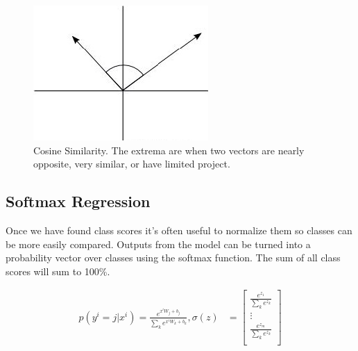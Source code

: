 \documentclass[twoside]{article}
\begin{document}
\begin{figure}[H]
\begin{minipage}[b]{0.25\textwidth}
    \caption*{$cos(\theta) \approx 1$}
  \end{minipage}
  \hfill
  \begin{minipage}[b]{0.25\textwidth}
    \includegraphics[width=\textwidth]{pics/lecture_8_dot_prod_1.jpg}
    \caption*{$cos(\theta) \approx 0$}
  \end{minipage}
  \caption{Cosine Similarity. The extrema are when two vectors are nearly opposite, very similar, or have limited project.  }
\end{figure}

\subsection{Softmax Regression}
Once we have found class scores it's often useful to normalize them so classes can be more easily compared. Outputs from the model can be turned into a probability vector over classes using the softmax function. The sum of all class scores will sum to 100\%.
\newline

\begin{align}
    p(y^i = j|x^i) = \frac{e^{x^iW_j + b_j}}{\sum_k e^{x^iW_k + b_k}},     			\sigma(z) &= \begin{bmatrix}
    \frac{e^{z_1}}{\sum_k e^{z_k}} \\
    \vdots \\
    \frac{e^{z_m}}{\sum_k e^{z_k}} \\
    \end{bmatrix}
\end{align}
\end{document}
